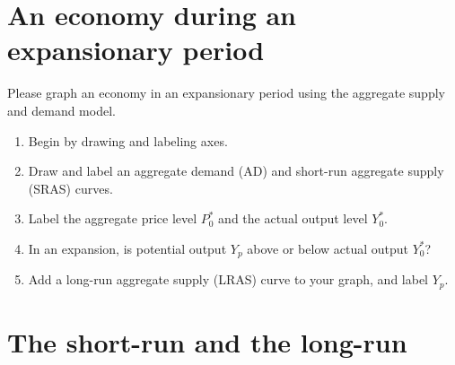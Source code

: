 \documentclass[
    letterpaper,paper=portrait,fleqn,
    DIV=16,fontsize=12pt,twoside=semi,
    parskip=full-,
    headings=standardclasses]
{scrartcl}
\begin{document}
\vfill

\begin{center}
\end{center}

\clearpage

\section{An economy during an expansionary period\label{sec:expansion}}

Please graph an economy in an expansionary period using the aggregate supply and demand model.

\begin{enumerate}
\item Begin by drawing and labeling axes.
\item Draw and label an aggregate demand (AD) and short-run aggregate supply (SRAS) curves.
\item Label the aggregate price level $P^*_0$ and the actual output level $Y^*_0$.
\item In an expansion, is potential output $Y_p$ above or below actual output $Y^*_0$? \hfill \underline{\hspace{1.5in}}
\item Add a long-run aggregate supply (LRAS) curve to your graph, and label $Y_p$.
\end{enumerate}

\vfill

\begin{center}
\end{center}

\section{The short-run and the long-run}
\end{document}
